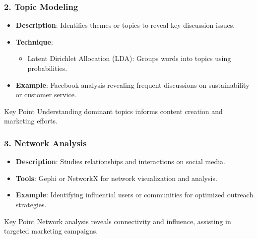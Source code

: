 \documentclass{beamer}
\begin{document}
\begin{frame}[fragile]
    \frametitle{2. Topic Modeling}
    
    \begin{itemize}
        \item \textbf{Description}: Identifies themes or topics to reveal key discussion issues.
        \item \textbf{Technique}: 
        \begin{itemize}
            \item Latent Dirichlet Allocation (LDA): Groups words into topics using probabilities.
        \end{itemize}
        \item \textbf{Example}: Facebook analysis revealing frequent discussions on sustainability or customer service.
    \end{itemize}
    
    \begin{block}{Key Point}
        Understanding dominant topics informs content creation and marketing efforts.
    \end{block}
\end{frame}

\begin{frame}[fragile]
    \frametitle{3. Network Analysis}
    
    \begin{itemize}
        \item \textbf{Description}: Studies relationships and interactions on social media.
        \item \textbf{Tools}: Gephi or NetworkX for network visualization and analysis.
        \item \textbf{Example}: Identifying influential users or communities for optimized outreach strategies.
    \end{itemize}
    
    \begin{block}{Key Point}
        Network analysis reveals connectivity and influence, assisting in targeted marketing campaigns.
    \end{block}
\end{frame}
\end{document}
